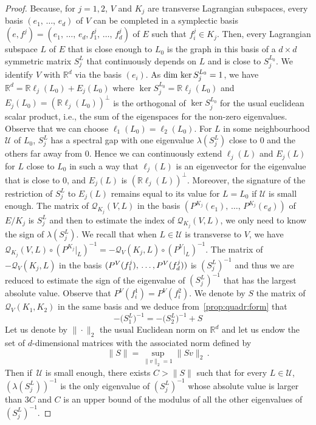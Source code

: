 \documentclass[AHL, Unicode, longabstracts, published]{cedram}
\newcommand*\cq{\mathcal{Q}}
\newcommand*\cU{\mathcal{U}}
\newcommand*\cal{\mathcal}
\newcommand*\R{\mathbb{R}}
\renewcommand*\dim{{\rm dim}\,}
\begin{document}
\begin{proof}
Because, for $j=1,2$, $V$ and $K_j$ are transverse Lagrangian subspa\-ces, every basis $(e_1, \,\dots,\, e_d)$ of $V$ can be completed in a symplectic basis $(e, f^j)=(e_1, \,\dots,\, e_d, f^j_1,\, \dots,\, f^j_d)$ of $E$ such that $f^j_i\in K_j$. Then, every Lagrangian subspace $L$ of $E$ that is close enough to $L_0$ is the graph in this basis of a $d\times d$ symmetric matrix $S_j^L$ that continuously depends on $L$ and is close to $S_j^{L_0}$.  We identify $V$ with $\R^d$ via the basis $(e_i)$.\newline
As $\dim\ker S_j^{L_0}=1$, we have $\R^d=\R \ell_j(L_0)+E_j(L_0)$ where $\ker S_j^{L_0}=\R\ell_j(L_0)$ and $E_j(L_0)=(\R \ell_j(L_0))^\bot$ is the orthogonal of $\ker S_j^{L_0}$ for the usual euclidean scalar product, i.e., the sum of the eigenspaces for the non-zero eigenvalues. Observe that we can choose $\ell_1(L_0)=\ell_2(L_0)$. For $L$ in some neighbourhood $\cU$ of $L_0$, $S_j^L$ has a spectral gap with one eigenvalue $\lambda(S_j^L)$ close to $0$ and the others far away from $0$. Hence we can continuously extend $\ell_j(L)$ and $E_j(L)$ for $L$ close to $L_0$ in such a way that $\ell_j(L)$ is an eigenvector for the eigenvalue that is close to $0$, and $E_j(L)$ is $(\R\ell_j(L))^\perp$. Moreover, the signature of the restriction of $S_j^L$ to $E_j(L)$ remains equal to its value for $L=L_0$ if $\cal U$ is small enough. \newline
The matrix of $\cq_{K_j}(V, L)$ in the basis $(P^{K_j}(e_1), \,\dots,\, P^{K_j}(e_d))$ of $E/K_j$ is $S_j^L$ and then to estimate the index of $\cq_{K_j}(V, L)$, we only need to know the sign of $\lambda(S_j^L)$.
We recall that when $L\in \cU$ is transverse to $V$, we have $\cq_{K_j}(V, L)\circ (P^{K_j}|_{L})^{-1}=-\cq_{V}(K_j, L)\circ(P^V|_{L})^{-1}$. The matrix of $-\cq_{V}(K_j, L)$ in the basis $(P^V(f_1^j),\,\dots,\linebreak P^V(f_d^j))$ is $(S_j^L)^{-1}$ and thus we are reduced to estimate the sign of the eigenvalue of $(S_j^L)^{-1}$ that has the largest absolute value. Observe that $P^V(f_i^1)=P^V(f_i^2)$. We denote by $S$ the matrix of $ \cq_{V}(K_1,K_2)$ in the same basis and we deduce from~\eqref{prop:quadr:form} that
\begin{equation}\label{Ematsym}
-\Big(S_1^L\Big)^{-1}=-\Big(S_2^L\Big)^{-1}+S
\end{equation}
Let us denote by $\|\cdot\|_2$ the usual Euclidean norm on $\R^d$ and let us endow the set of $d$-dimensional matrices with the associated norm defined by
\[
\| S\|=\sup_{\|v\|_2=1} \|Sv\|_2\,.
\]
Then if $\,\cU$ is small enough, there exists $C>\| S\|$ such that for every $L\in \cU$,
$(\lambda(S_j^L))^{-1}$ is the only eigenvalue of $(S_j^L)^{-1}$ whose absolute value is larger than $3C$ and $C$ is an upper bound of the modulus of all the other eigenvalues of $(S_j^L)^{-1}$.


\end{proof}
\end{document}
